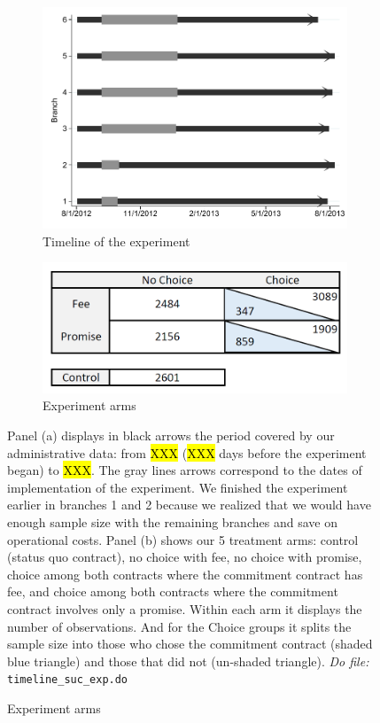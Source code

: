 \documentclass[11pt]{article}
\begin{document}
\begin{figure}[H]
     \caption{Experiment description}
    \label{exp_description}
    \begin{center}
    \begin{subfigure}{.50\textwidth}
      \caption{Timeline of the experiment}
        \centering
        \includegraphics[width=\textwidth]{Figuras/timeline_suc_exp_extended.pdf}
    \end{subfigure}
    \begin{subfigure}{0.45\textwidth}
    \caption{Experiment arms}
       \centering
      \includegraphics[width=\textwidth]{Figuras/exp_arms.PNG}
    \end{subfigure}
    \end{center}
         \scriptsize Panel (a) displays in black arrows the period covered by our administrative data: from \hl{XXX} (\hl{XXX} days before the experiment began) to \hl{XXX}. The gray lines arrows correspond to the dates of implementation of the experiment. We finished the experiment earlier in branches 1 and 2 because we realized that we would have enough sample size with the remaining branches and save on operational costs. Panel (b) shows our 5 treatment arms: control (status quo contract), no choice with fee, no choice with promise, choice among both contracts where the commitment contract has fee, and choice among both contracts where the commitment contract involves only a promise. Within each arm it displays the number of observations. And  for the Choice groups it splits the sample size into those who chose the commitment contract (shaded blue triangle) and those that did not (un-shaded triangle).
      \textit{Do file: }  \texttt{timeline\_suc\_exp.do}
\end{figure}
\end{document}
